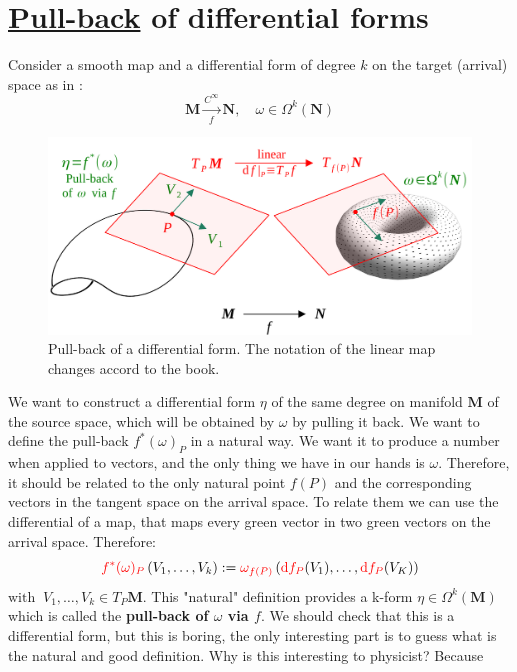 \documentclass[../main.tex]{subfiles}
\begin{document}
\section[Pull-back of differential forms]{\href{https://it.wikipedia.org/wiki/Pull-back}{Pull-back} of differential forms}
Consider a smooth map and a differential form of degree $k$ on the target (arrival) space as in :
\[
\mathbf{M}\xrightarrow[f]{C^\infty}\mathbf{N}, \quad \omega \in \Omega^k(\mathbf{N})
\]
\begin{figure}[H]
	\includegraphics{images/pull_back.pdf}
	\caption{Pull-back of a differential form. The notation of the linear map changes accord to the book.}
\end{figure}
We want to construct a differential form $\eta$ of the same degree on manifold $\mathbf{M}$ of the source space, which will be obtained by $\omega$ by pulling it back. We want to define the pull-back $f^\ast(\omega)_P$ in a natural way. We want it to produce a number when applied to vectors, and the only thing we have in our hands is $\omega$. Therefore, it should be related to the only natural point $f(P)$ and the corresponding vectors in the tangent space on the arrival space. To relate them we can use the differential of a map, that maps every green vector in two green vectors on the arrival space. Therefore:
\[
{\color{red} f^\ast(\omega)_P}\left(V_1,\dots,V_k\right):= {\color{red}\omega_{f(P)}}\left({\color{red}\textrm{d}f_P}(V_1),\dots,{\color{red}\textrm{d}f_P}(V_K)\right)
\]
$\textrm{with } \ V_1,\dots,V_k \in T_P\mathbf{M}$. This "natural" definition provides a k-form $\eta\in\Omega^k(\mathbf{M})$ which is called the \textbf{pull-back of $\omega$ via $f$}. We should check that this is a differential form, but this is boring, the only interesting part is to guess what is the natural and good definition. Why is this interesting to physicist? Because\\
\end{document}
